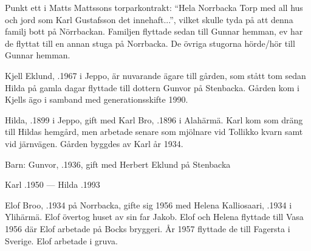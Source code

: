 Punkt ett i Matts Mattssons torparkontrakt: ``Hela Norrbacka Torp med all hus och jord som Karl Gustafsson det innehaft...'', vilket skulle tyda på att denna familj bott på Nörrbackan. Familjen flyttade sedan till Gunnar hemman, ev har de flyttat till en annan stuga på Norrbacka. De övriga stugorna hörde/hör till Gunnar hemman.






Kjell Eklund, .1967 i Jeppo, är nuvarande ägare till gården, som stått tom sedan Hilda på gamla dagar flyttade till dottern Gunvor på Stenbacka. Gården kom i Kjells ägo i samband med generationsskifte 1990.\jhvspace{}


Hilda, .1899 i Jeppo, gift med Karl Bro, .1896 i Alahärmä. Karl kom som dräng till Hildas hemgård, men arbetade senare som mjölnare vid Tollikko kvarn samt vid järnvägen. Gården byggdes av Karl år 1934.

Barn: Gunvor, .1936, gift med Herbert Eklund på Stenbacka

Karl .1950  ---  Hilda .1993






Elof Broo, .1934 på Norrbacka, gifte sig 1956 med Helena Kalliosaari, .1934 i Ylihärmä. Elof övertog huset av sin far Jakob. Elof och Helena flyttade till Vasa 1956 där Elof arbetade på Bocks bryggeri. År 1957 flyttade de till Fagersta i Sverige. Elof arbetade i gruva.
\begin{jhchildren}
  \item {}
  \item {}
  \item {}
  \item {}
\end{jhchildren}

